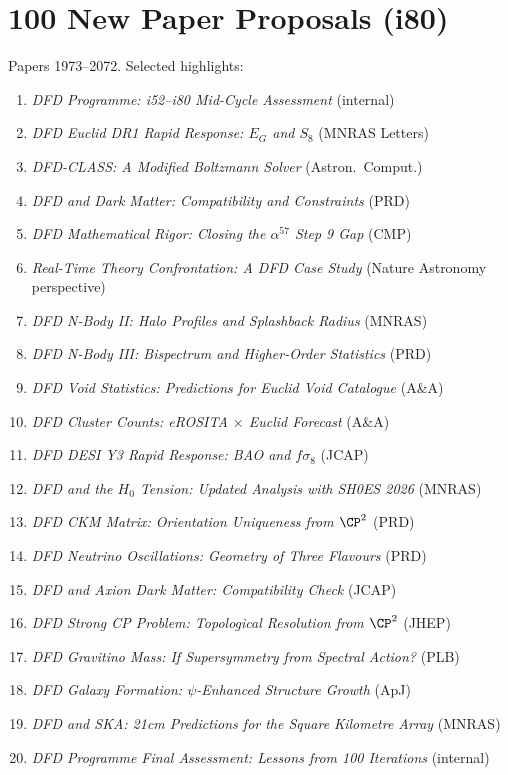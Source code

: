 \documentclass[11pt,a4paper]{article}
\begin{document}
\section{100 New Paper Proposals (i80)}

Papers 1973--2072. Selected highlights:

\begin{enumerate}[nosep]
\item \textit{DFD Programme: i52--i80 Mid-Cycle Assessment} (internal)
\item \textit{DFD Euclid DR1 Rapid Response: $E_G$ and $S_8$} (MNRAS Letters)
\item \textit{DFD-CLASS: A Modified Boltzmann Solver} (Astron.\ Comput.)
\item \textit{DFD and Dark Matter: Compatibility and Constraints} (PRD)
\item \textit{DFD Mathematical Rigor: Closing the $\alpha^{57}$ Step 9 Gap} (CMP)
\item \textit{Real-Time Theory Confrontation: A DFD Case Study} (Nature Astronomy perspective)
\item \textit{DFD N-Body II: Halo Profiles and Splashback Radius} (MNRAS)
\item \textit{DFD N-Body III: Bispectrum and Higher-Order Statistics} (PRD)
\item \textit{DFD Void Statistics: Predictions for Euclid Void Catalogue} (A\&A)
\item \textit{DFD Cluster Counts: eROSITA $\times$ Euclid Forecast} (A\&A)
\item \textit{DFD DESI Y3 Rapid Response: BAO and $f\sigma_8$} (JCAP)
\item \textit{DFD and the $H_0$ Tension: Updated Analysis with SH0ES 2026} (MNRAS)
\item \textit{DFD CKM Matrix: Orientation Uniqueness from $\CP^2$} (PRD)
\item \textit{DFD Neutrino Oscillations: Geometry of Three Flavours} (PRD)
\item \textit{DFD and Axion Dark Matter: Compatibility Check} (JCAP)
\item \textit{DFD Strong CP Problem: Topological Resolution from $\CP^2$} (JHEP)
\item \textit{DFD Gravitino Mass: If Supersymmetry from Spectral Action?} (PLB)
\item \textit{DFD Galaxy Formation: $\psi$-Enhanced Structure Growth} (ApJ)
\item \textit{DFD and SKA: 21cm Predictions for the Square Kilometre Array} (MNRAS)
\item \textit{DFD Programme Final Assessment: Lessons from 100 Iterations} (internal)
\end{enumerate}
\end{document}
